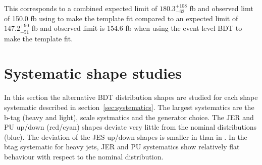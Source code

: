 This corresponds to a combined expected limit of $180.3^{+108}_{-62}$ fb and observed limt of 150.0 fb using \HT to make the template fit compared to an expected limit of $147.2^{+90}_{-51}$ fb and observed limit is 154.6 fb when using the event level BDT to make the template fit.

\section{Systematic shape studies}

In this section the alternative BDT distribution shapes are studied for each shape systematic described in section~\ref{sec:systematics}. The largest systematics are the b-tag (heavy and light), scale systmatics and the \ttbar generator choice. The JER and PU up/down (red/cyan) shapes deviate very little from the nominal distributions (blue). The deviation of the JES up/down shapes is smaller in \ttbar than in \tttt. In \ttbar the btag systematic for heavy jets, JER and PU systematics show relatively flat behaviour with respect to the nominal distribution.

